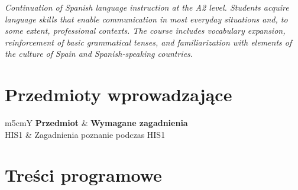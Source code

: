 \documentclass[12pt, a4paper]{article}
\newcommand{\thdrule}{\noalign{\global\setlength{\extrarowheight}{0pt}}}
\newcommand{\thdend}{\noalign{\global\setlength{\extrarowheight}{3pt}}}
\begin{document}
\textit{Continuation of Spanish language instruction at the A2 level. Students acquire language skills that enable communication in most everyday situations and, to some extent, professional contexts. The course includes vocabulary expansion, reinforcement of basic grammatical tenses, and familiarization with elements of the culture of Spain and Spanish-speaking countries.}


\section{Przedmioty wprowadzające}

{\scriptsize
\begin{tabularx}{\textwidth}{m{5cm}Y}
\thdrule\toprule
{} {\color{white}\textbf{Przedmiot}} & {\color{white}\textbf{Wymagane zagadnienia}} \\
\midrule\thdend
   HIS1 & Zagadnienia poznanie podczas HIS1 \\
\bottomrule
\end{tabularx}}

\section{Treści programowe}
\end{document}
